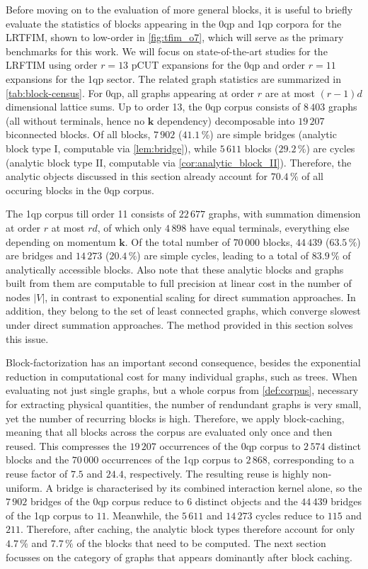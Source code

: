 \documentclass[]{amsart}
\numberwithin{mythm}{section}
\begin{document}
Before moving on to the evaluation of more general blocks, it is useful to briefly evaluate the statistics of blocks appearing in the 0qp and 1qp corpora for the LRTFIM, shown to low-order in \cref{fig:tfim_o7}, which will serve as the primary benchmarks for this work. We will focus on state-of-the-art studies for the LRFTIM using order $r=13$ pCUT expansions for the 0qp and order $r=11$ expansions for the 1qp sector. The related graph statistics are summarized in \cref{tab:block-census}. For 0qp, all graphs appearing at order $r$ are at most $(r-1)d$ dimensional lattice sums. Up to order 13, the 0qp corpus consists of $8\,403$ graphs (all without terminals, hence no $\bm k$ dependency) decomposable into $19\,207$ biconnected blocks. Of all blocks, $7\,902$ ($41.1\,\%$) are simple bridges (analytic block type I, computable via \cref{lem:bridge}), while $5\,611$ blocks ($29.2\,\%$) are cycles (analytic block type II, computable via \cref{cor:analytic_block_II}). Therefore, the analytic objects discussed in this section already account for $70.4\,\%$ of all occuring blocks in the 0qp corpus. 

The 1qp corpus till order 11 consists of $22\,677$ graphs, with summation dimension at order $r$ at most $rd$, of which only $4\,898$ have equal terminals, everything else depending on momentum $\bm k$. Of the total number of $70\,000$ blocks, $44\,439$ ($63.5\,\%$) are bridges and $14\,273$ ($20.4\,\%$) are simple cycles, leading to a total of $83.9\,\%$ of analytically accessible blocks. Also note that these analytic blocks and graphs built from them are computable to full precision at linear cost in the number of nodes $|V|$, in contrast to exponential scaling for direct summation approaches. In addition, they belong to the set of least connected graphs, which converge slowest under direct summation approaches. The method provided in this section solves this issue.


Block-factorization has an important second consequence, besides the exponential reduction in computational cost for many individual graphs, such as trees. When evaluating not just single graphs, but a whole corpus from \cref{def:corpus}, necessary for extracting physical quantities, the number of rendundant graphs is very small, yet the number of recurring blocks is high. Therefore, we apply block-caching, meaning that all blocks across the corpus are evaluated only once and then reused. This compresses the $19\,207$ occurrences of the 0qp corpus to $2\,574$ distinct blocks and the $70\,000$ occurrences of the 1qp corpus to $2\,868$, corresponding to a reuse factor of $7.5$ and $24.4$, respectively. The resulting reuse is highly non-uniform. A bridge is characterised by its combined interaction kernel alone, so the $7\,902$ bridges of the 0qp corpus reduce to $6$ distinct objects and the $44\,439$ bridges of the 1qp corpus to $11$. Meanwhile, the $5\,611$ and $14\,273$ cycles reduce to $115$ and $211$. Therefore, after caching, the analytic block types therefore account for only $4.7\,\%$ and $7.7\,\%$ of the blocks that need to be computed. The next section focusses on the category of graphs that appears dominantly after block caching.
\end{document}
